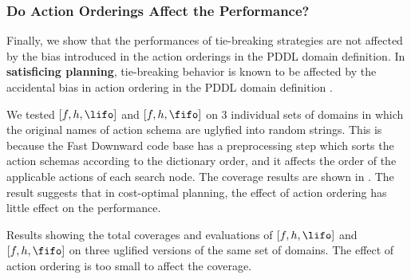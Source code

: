 
\subsubsection{Do Action Orderings Affect the Performance?}

Finally, we show that the performances of tie-breaking strategies are
not affected by the bias introduced in the action orderings in the PDDL
domain definition.
In \textbf{satisficing planning}, tie-breaking behavior
is known to be affected by the accidental bias in action ordering in the PDDL domain
definition \cite{vallati2015effective}.

We tested $[f,h,\lifo]$ and $[f,h,\fifo]$
on 3 individual sets of domains in which the
original names of action schema are uglyfied into random strings. This is because
the Fast Downward code base has a preprocessing
step which sorts the action schemas according to the dictionary
order, and it affects the order of the applicable actions of each search node.
% 
The coverage results are shown in .
The result suggests that in cost-optimal planning, the effect of action
ordering has little effect on the performance.
% 

\begin{table}[tb]
 \centering {}
 

 \caption{Results showing the total coverages and evaluations
 of $[f,h,\lifo]$ and $[f,h,\fifo]$
 on three uglified versions of the same set of domains. The effect
 of action ordering is too small to affect the coverage.}
 \label{actionordering-robustness}
\end{table}
